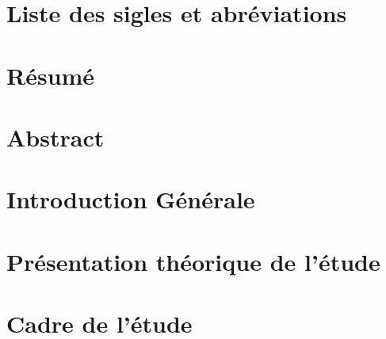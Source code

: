 \documentclass[12pt]{report}
\begin{document}
	
	\newpage
	
	
	\chapter*{Liste des sigles et abréviations}       %
	
	\printglossary[type=\acronymtype]
	
	\vspace*{1cm}
	\newpage
	
	\chapter*{Résumé}       %
	\vspace*{1cm}
	\newpage
	
	
	
	\chapter*{Abstract}       %
	\vspace*{1cm}
	\newpage
	
		
	\chapter*{Introduction Générale}       %
	\vspace*{1cm}
	\newpage
	
	
	\chapter{Présentation théorique de l'étude}


	\chapter{Cadre de l'étude}	
\end{document}
